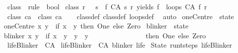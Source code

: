 \begin{isabellebody}
\isanewline
{}\isamarkupfalse%
\ class{}\ {\isacharcolon}{\isacharcolon}\ {\isachardoublequoteopen}rule\ {\isasymRightarrow}\ bool{\isachardoublequoteclose}\ \isanewline
{\isachardoublequoteopen}class{}\ r\ {\isasymequiv}\ {\isacharparenleft}{\isasymforall}\ s{\isachardot}\ {\isacharparenleft}{\isasymexists}\ f{\isachardot}\ {\isacharparenleft}CA\ s\ r{\isacharparenright}\ yields\ f\ {\isasymand}\ loops\ {\isacharparenleft}CA\ f\ r{\isacharparenright}{\isacharparenright}{\isacharparenright}{\isachardoublequoteclose}\isanewline
\isanewline
{}\isamarkupfalse%
\ {\isachardoublequoteopen}class{}\ ca\ {\isasymLongrightarrow}\ class{}\ ca{\isachardoublequoteclose}\isanewline
%
\isadelimproof
\ \ %
\endisadelimproof
%
\isatagproof
{}\isamarkupfalse%
\ class{}{\isacharunderscore}def\ class{}{\isacharunderscore}def\ loops{\isacharunderscore}def\ \isamarkupfalse%
\ auto%
\endisatagproof
{\isafoldproof}%
%
\isadelimproof
%
\endisadelimproof
%
\isadelimdocument
%
\endisadelimdocument
%
\isatagdocument
%
\isamarkuptrue%
%
\endisatagdocument
{\isafolddocument}%
%
\isadelimdocument
%
\endisadelimdocument
{}\isamarkupfalse%
\ oneCentre\ {\isacharcolon}{\isacharcolon}\ state\ \isanewline
{\isachardoublequoteopen}oneCentre\ x\ y\ {\isacharequal}\ {\isacharparenleft}if\ x{\isacharequal}{}\ {\isasymand}\ y{\isacharequal}{}\ then\ One\ else\ Zero{\isacharparenright}{\isachardoublequoteclose}\isanewline
\isanewline
{}\isamarkupfalse%
\ blinker\ {\isacharcolon}{\isacharcolon}\ state\ \isanewline
{\isachardoublequoteopen}blinker\ x\ y\ {\isacharequal}\ {\isacharparenleft}if\ x{\isacharequal}{}\ {\isasymand}\ {\isacharparenleft}y{\isacharequal}{\isacharminus}{}\ {\isasymor}\ y{\isacharequal}{}\ {\isasymor}\ y{\isacharequal}{}{\isacharparenright}\isanewline
\ \ \ \ \ \ \ \ \ \ \ \ \ \ \ \ then\ One\ else\ Zero{\isacharparenright}{\isachardoublequoteclose}\isanewline
\isanewline
{}\isamarkupfalse%
\ lifeBlinker\ {\isacharcolon}{\isacharcolon}\ CA\ \isanewline
{\isachardoublequoteopen}lifeBlinker\ {\isasymequiv}\ CA\ blinker\ life{\isachardoublequoteclose}\isanewline
\isanewline
{}\isamarkupfalse%
\ {\isachardoublequoteopen}State\ {\isacharparenleft}run{\isacharunderscore}t{\isacharunderscore}steps\ lifeBlinker\ {}{\isacharparenright}\ {\isacharparenleft}{}{\isacharparenright}\ {\isacharparenleft}{}{\isacharparenright}{\isachardoublequoteclose}\isanewline
\isanewline
%
\isadelimtheory
\isanewline
%
\endisadelimtheory
%
\isatagtheory
{}\isamarkupfalse%
%
\endisatagtheory
{\isafoldtheory}%
%
\isadelimtheory
%
\endisadelimtheory
%
\end{isabellebody}%
